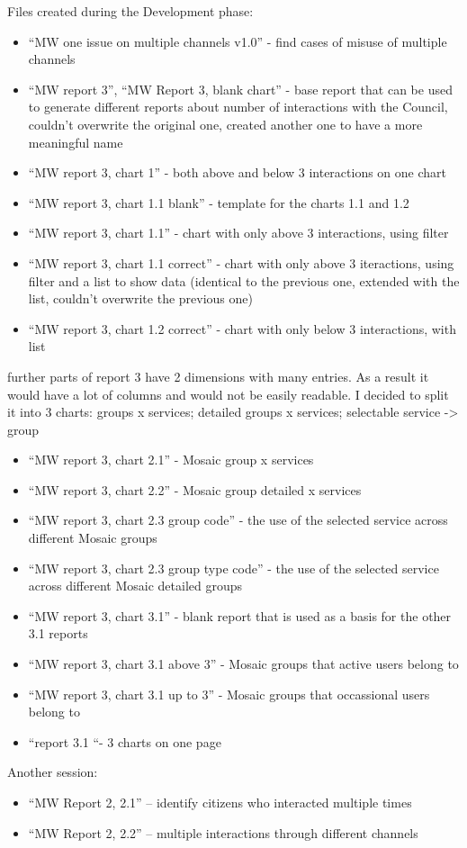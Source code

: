 Files created during the Development phase:
\begin{itemize}
\item “MW one issue on multiple channels v1.0” - find cases of misuse of multiple channels
\item “MW report 3”, “MW Report 3, blank chart” - base report that can be used to generate different reports about number of interactions with the Council, couldn't overwrite the original one, created another one to have a more meaningful name
\item “MW report 3, chart 1” - both above and below 3 interactions on one chart
\item “MW report 3, chart 1.1 blank” - template for the charts 1.1 and 1.2
\item “MW report 3, chart 1.1” - chart with only above 3 interactions, using filter
\item “MW report 3, chart 1.1 correct” - chart with only above 3 iteractions, using filter and a list to show data (identical to the previous one, extended with the list, couldn't overwrite the previous one)
\item “MW report 3, chart 1.2 correct” - chart with only below 3 interactions, with list
\end{itemize}
 
further parts of report 3 have 2 dimensions with many entries. As a result it would have a lot of columns and would not be easily readable. I decided to split it into 3 charts: groups x services; detailed groups x services; selectable service -> group

\begin{itemize}
\item “MW report 3, chart 2.1” - Mosaic group x services
\item “MW report 3, chart 2.2” - Mosaic group detailed x services
\item “MW report 3, chart 2.3 group code” - the use of the selected service across different Mosaic groups
\item “MW report 3, chart 2.3 group type code” - the use of the selected service across different Mosaic detailed groups
\item “MW report 3, chart 3.1” - blank report that is used as a basis for the other 3.1 reports
\item “MW report 3, chart 3.1 above 3” - Mosaic groups that active users belong to
\item “MW report 3, chart 3.1 up to 3” - Mosaic groups that occassional users belong to
\item “report 3.1 “- 3 charts on one page
\end{itemize}

Another session:
 
\begin{itemize}
\item “MW Report 2, 2.1” – identify citizens who interacted multiple times
\item “MW Report 2, 2.2” – multiple interactions through different channels
\end{itemize}
 
